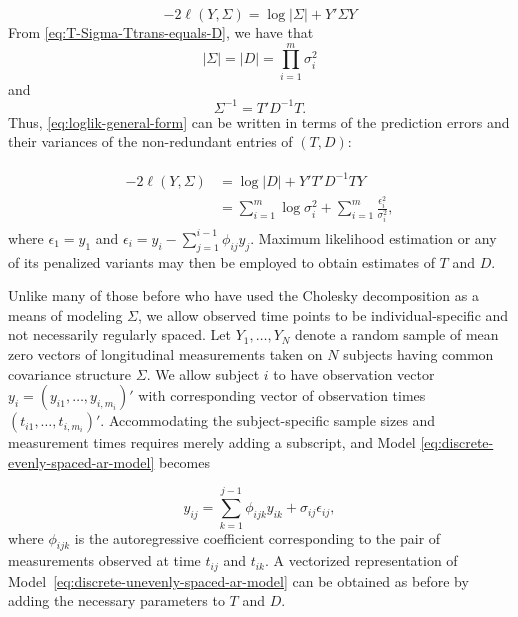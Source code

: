 \documentclass[12pt]{article}
\theoremstyle{definition}
\begin{document}
{{{{\begin{equation} \label{eq:loglik-general-form}
-2\ell\left( Y, \Sigma \right) = \log \vert \Sigma \vert + Y' \Sigma Y
\end{equation}
\noindent
From \ref{eq:T-Sigma-Ttrans-equals-D}, we have that 
\[
\vert \Sigma\vert = \vert D \vert = \prod_{i = 1}^m \sigma_i^2
\]
and 
\[
\Sigma^{-1} = T' D^{-1} T.
\]
Thus, \ref{eq:loglik-general-form} can be written in terms of the prediction errors and their variances of the non-redundant entries of $\left(T , D\right)$:

\begin{align}
\begin{split} \label{eq:loglik-cholesky-form}
-2\ell\left( Y, \Sigma \right) &= \log \vert D \vert + Y' T' D^{-1} T Y \\
&= \sum_{i = 1}^m \log \sigma_i^2  + \sum_{i = 1}^m \frac {\epsilon_i^2}{\sigma_i^2},
\end{split}
\end{align}
\noindent
where $\epsilon_1 = y_1$ and $\epsilon_i = y_i - \sum_{j = 1}^{i-1} \phi_{ij} y_j$. Maximum likelihood estimation or any of its penalized variants may then be employed to obtain estimates of $T$ and $D$.

\bigskip
Unlike many of those before who have used the Cholesky decomposition as a means of modeling $\Sigma$, we allow observed time points to be individual-specific and not necessarily regularly spaced.  Let $Y_1, \dots, Y_N$ denote a random sample of mean zero vectors of longitudinal measurements taken on $N$ subjects having common covariance structure $\Sigma$.  We allow subject $i$ to have observation vector $y_i = \left(y_{i1} ,\dots , y_{i,m_i}\right)'$ with corresponding vector of observation times $\left(t_{i1} ,\dots , t_{i,m_i}\right)'$.  Accommodating the subject-specific sample sizes and measurement times requires merely adding a subscript, and Model \ref{eq:discrete-evenly-spaced-ar-model} becomes 

\begin{equation}
{y}_{ij}  = \sum_{k=1}^{j-1} \phi_{ijk} y_{ik} + \sigma_{ij}\epsilon_{ij}, \label{eq:discrete-unevenly-spaced-ar-model}
\end{equation}
\noindent
where $\phi_{ijk}$ is the autoregressive coefficient corresponding to the pair of measurements observed at time $t_{ij}$ and $t_{ik}$. A vectorized representation of Model~\ref{eq:discrete-unevenly-spaced-ar-model} can be obtained as before by adding the necessary parameters to $T$ and $D$.
\bigskip

}}}}
\end{document}
